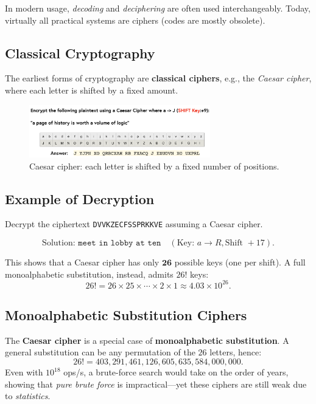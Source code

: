 In modern usage, \emph{decoding} and \emph{deciphering} are often used interchangeably. Today, virtually all practical systems are ciphers (codes are mostly obsolete).

\subsection{Classical Cryptography}

The earliest forms of cryptography are \textbf{classical ciphers}, e.g., the \emph{Caesar cipher}, where each letter is shifted by a fixed amount.

\begin{figure}[h!]
\centering
\includegraphics[width=0.7\textwidth]{Pictures/encrypt example.png}
\caption{Caesar cipher: each letter is shifted by a fixed number of positions.}
\label{fig:caesar_cipher}
\end{figure}

\subsection{Example of Decryption}

Decrypt the ciphertext \texttt{DVVKZECFSSPRKKVE} assuming a Caesar cipher.

\[
\text{Solution: } \texttt{meet in lobby at ten} \quad (\text{Key: } a \rightarrow R, \text{Shift } +17).
\]

This shows that a Caesar cipher has only \(\mathbf{26}\) possible keys (one per shift). A full monoalphabetic substitution, instead, admits \(26!\) keys:
\[
26! = 26 \times 25 \times \cdots \times 2 \times 1 \approx 4.03 \times 10^{26}.
\]

\subsection{Monoalphabetic Substitution Ciphers}

The \textbf{Caesar cipher} is a special case of \textbf{monoalphabetic substitution}. A general substitution can be any permutation of the \(26\) letters, hence:
\[
26! = 403{,}291{,}461{,}126{,}605{,}635{,}584{,}000{,}000.
\]
Even with \(10^{18}\) ops/s, a brute-force search would take on the order of years, showing that \emph{pure brute force} is impractical—yet these ciphers are still weak due to \emph{statistics}.

